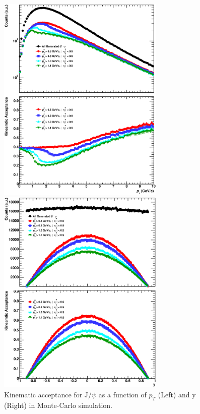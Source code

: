 \begin{figure}[!h]
  \begin{minipage}{0.5\hsize}
    \begin{center}
      \includegraphics[width=8cm]{chap4/figure//Kinematics/MCJpsi_ptacce.eps}
    \end{center}
  \end{minipage}
  \begin{minipage}{0.5\hsize}
    \begin{center}
      \includegraphics[width=8cm]{chap4/figure//Kinematics/MCJpsi_yacce.eps}
    \end{center}
  \end{minipage}
  \caption{
    Kinematic acceptance for J/$\psi$ as a function of $p_{T}$ (Left) and y (Right) in Monte-Carlo simulation.
  }
  \label{fig_4_jpsiacce}
\end{figure}

